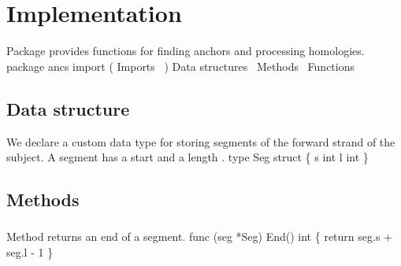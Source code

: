 \nwfilename{}\nwenddocs{}\nwdocspar%
\section{Implementation}
Package  provides functions for finding anchors and
processing homologies.
\nwenddocs{}\endmoddef\nwstartdeflinemarkup\nwenddeflinemarkup
package ancs
import (
          \LA{}Imports~{\nwtagstyle{}}\RA{}
)
\LA{}Data structures~{\nwtagstyle{}}\RA{}
\LA{}Methods~{\nwtagstyle{}}\RA{}
\LA{}Functions~{\nwtagstyle{}}\RA{}
\nwendcode{}\nwdocspar
\subsection{Data structure }
We declare a custom data type  for storing segments of the
forward strand of the subject. A segment has a start  and a
length .
\nwenddocs{}\endmoddef\nwstartdeflinemarkup{}\nwenddeflinemarkup
type Seg struct \{
          s int
          l int
\}
\nwendcode{}\nwdocspar
\subsection{Methods}
\subsubsection{}
Method  returns an end of a segment.
\nwenddocs{}\endmoddef\nwstartdeflinemarkup{}\nwenddeflinemarkup
func (seg *Seg) End() int \{
          return seg.s + seg.l - 1
\}
\nwendcode{}\nwdocspar
